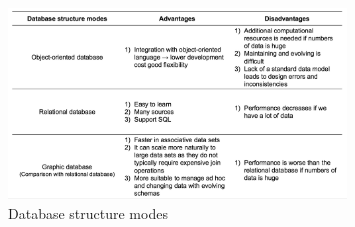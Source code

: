
\begin{figure}
	\begin{center}
		\includegraphics[width=0.8\textwidth]{WolverineChart2}
	\end{center}
	\caption{Database structure modes}
\end{figure}
\clearpage
